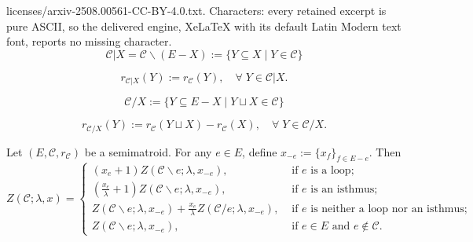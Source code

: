 \documentclass[10pt,a4paper]{amsart}
\renewcommand*{\bm}[1]{#1}%
\begin{document}
licenses/arxiv-2508.00561-CC-BY-4.0.txt. Characters: every retained excerpt is pure ASCII, so the delivered engine, XeLaTeX with its default Latin Modern text font, reports no missing character.
\begin{equation}\label{Deletion1}
\mathcal{C}|X=\mathcal{C}\backslash (E-X):=\{Y\subseteq X\mid Y\in\mathcal{C}\}
\end{equation}

\begin{equation}\label{Deletion-Rank-Semi}
r_{\mathcal{C}|X}(Y):=r_{\mathcal{C}}(Y),\quad\forall \;Y\in\mathcal{C}|X.
\end{equation}

\begin{equation}\label{Contraction1}
\mathcal{C}/X:=\{Y\subseteq E-X\mid Y\sqcup X\in\mathcal{C}\}
\end{equation}

\begin{equation}\label{Contraction-Rank-Semi}
r_{\mathcal{C}/X}(Y):=r_{\mathcal{C}}(Y\sqcup X)-r_{\mathcal{C}}(X),\quad\forall \;Y\in\mathcal{C}/X.
\end{equation}

\begin{theorem}\label{Mul-DCF}
Let $(E,\mathcal{C},r_{\mathcal{C}})$ be a semimatroid. For any $e\in E$, define $\bm x_{-e}:=\{x_f\}_{f\in E-e}$. Then 
\[
Z(\mathcal{C};\lambda,\bm x)=
\begin{cases}
(x_e+1)Z(\mathcal{C}\backslash e;\lambda,\bm x_{-e}),&\text{ if } e \text{ is a loop};\\
(\frac{x_e}{\lambda}+1)Z(\mathcal{C}\backslash e;\lambda,\bm x_{-e}),&\text{ if } e \text{ is an isthmus};\\
Z(\mathcal{C}\backslash e;\lambda,\bm x_{-e})+\frac{x_e}{\lambda}Z(\mathcal{C}/e;\lambda,\bm x_{-e}),&\text{ if } e \text{ is neither a loop nor an isthmus};\\
Z(\mathcal{C}\backslash e;\lambda,\bm x_{-e}),&\text{ if } e\in E \text{ and } e\notin\mathcal{C}.
\end{cases}
\]
\end{theorem}
\end{document}

